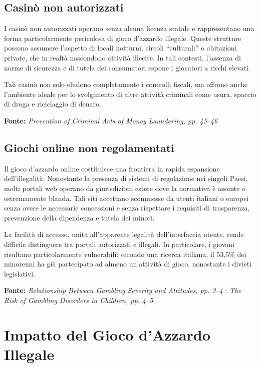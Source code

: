 \documentclass[a4paper,12pt]{article}
\begin{document}
\subsection{Casinò non autorizzati}

I casinò non autorizzati operano senza alcuna licenza statale e rappresentano una forma particolarmente pericolosa di gioco d’azzardo illegale. Queste strutture possono assumere l’aspetto di locali notturni, circoli “culturali” o abitazioni private, che in realtà nascondono attività illecite. In tali contesti, l’assenza di norme di sicurezza e di tutela dei consumatori espone i giocatori a rischi elevati.

Tali casinò non solo eludono completamente i controlli fiscali, ma offrono anche l’ambiente ideale per lo svolgimento di altre attività criminali come usura, spaccio di droga e riciclaggio di denaro.

\textbf{Fonte:} \textit{Prevention of Criminal Acts of Money Laundering, pp. 45--46} \cite{tarina2019moneylaundering}

\subsection{Giochi online non regolamentati}

Il gioco d’azzardo online costituisce una frontiera in rapida espansione dell’illegalità. Nonostante la presenza di sistemi di regolazione nei singoli Paesi, molti portali web operano da giurisdizioni estere dove la normativa è assente o estremamente blanda. Tali siti accettano scommesse da utenti italiani o europei senza avere le necessarie concessioni e senza rispettare i requisiti di trasparenza, prevenzione della dipendenza e tutela dei minori.

La facilità di accesso, unita all’apparente legalità dell’interfaccia utente, rende difficile distinguere tra portali autorizzati e illegali. In particolare, i giovani risultano particolarmente vulnerabili: secondo una ricerca italiana, il 53,5\% dei minorenni ha già partecipato ad almeno un’attività di gioco, nonostante i divieti legislativi.

\textbf{Fonte:} \textit{Relationship Between Gambling Severity and Attitudes, pp. 3--4} \cite{gori2014adolescentgambling}; \textit{The Risk of Gambling Disorders in Children, pp. 4--5} \cite{ferrara2019childrenrisk}

\section{Impatto del Gioco d'Azzardo Illegale}
\end{document}
